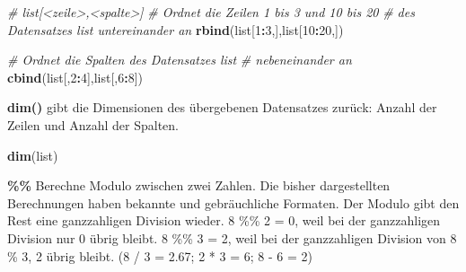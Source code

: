 \documentclass[]{book}
\newenvironment{Shaded}{\begin{snugshade}}{\end{snugshade}}
\newcommand{\KeywordTok}[1]{\textcolor[rgb]{0.13,0.29,0.53}{\textbf{#1}}}
\newcommand{\DecValTok}[1]{\textcolor[rgb]{0.00,0.00,0.81}{#1}}
\newcommand{\StringTok}[1]{\textcolor[rgb]{0.31,0.60,0.02}{#1}}
\newcommand{\CommentTok}[1]{\textcolor[rgb]{0.56,0.35,0.01}{\textit{#1}}}
\newcommand{\OperatorTok}[1]{\textcolor[rgb]{0.81,0.36,0.00}{\textbf{#1}}}
\newcommand{\NormalTok}[1]{#1}
\begin{document}
\begin{Shaded}
\begin{Highlighting}[]
\CommentTok{# list[<zeile>,<spalte>]}
\CommentTok{# Ordnet die Zeilen 1 bis 3 und 10 bis 20}
\CommentTok{# des Datensatzes list untereinander an}
\KeywordTok{rbind}\NormalTok{(list[}\DecValTok{1}\OperatorTok{:}\DecValTok{3}\NormalTok{,],list[}\DecValTok{10}\OperatorTok{:}\DecValTok{20}\NormalTok{,])}

\CommentTok{# Ordnet die Spalten des Datensatzes list }
\CommentTok{# nebeneinander an}
\KeywordTok{cbind}\NormalTok{(list[,}\DecValTok{2}\OperatorTok{:}\DecValTok{4}\NormalTok{],list[,}\DecValTok{6}\OperatorTok{:}\DecValTok{8}\NormalTok{])}
\end{Highlighting}
\end{Shaded}

\begin{Shaded}
\end{Shaded}

\textbf{dim()} gibt die Dimensionen des übergebenen Datensatzes zurück:
Anzahl der Zeilen und Anzahl der Spalten.

\begin{Shaded}
\begin{Highlighting}[]
\KeywordTok{dim}\NormalTok{(list)}
\end{Highlighting}
\end{Shaded}

\textbf{\%\%} Berechne Modulo zwischen zwei Zahlen. Die bisher
dargestellten Berechnungen haben bekannte und gebräuchliche Formaten.
Der Modulo gibt den Rest eine ganzzahligen Division wieder. 8 \%\% 2 =
0, weil bei der ganzzahligen Division nur 0 übrig bleibt. 8 \%\% 3 = 2,
weil bei der ganzzahligen Division von 8 \% 3, 2 übrig bleibt. (8 / 3 =
2.67; 2 * 3 = 6; 8 - 6 = 2)
\end{document}
